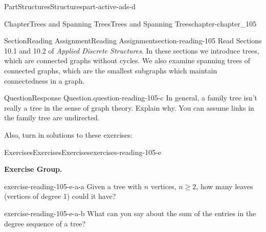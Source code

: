\documentclass[oneside,10pt,]{book}
\numberwithin{equation}{section}
\begin{document}
\begin{partptx}{Part}{Structures}{}{Structures}{}{}{part-active-ads-d}
\typeout{************************************************}
%
\begin{chapterptx}{Chapter}{Trees and Spanning Trees}{}{Trees and Spanning Trees}{}{}{chapter-chapter_105}
\renewcommand*{\chaptername}{Chapter}
\index{}%
%
%
\typeout{************************************************}
\typeout{************************************************}
%
\begin{sectionptx}{Section}{Reading Assignment}{}{Reading Assignment}{}{}{section-reading-105}
Read Sections 10.1 and 10.2 of \emph{Applied Discrete Structures}. In these sections we introduce trees, which are connected graphs without cycles.  We also examine spanning trees of connected graphs, which are the smallest subgraphs which maintain connectedness in a graph.%
\begin{question}{Question}{Response Question.}{question-reading-105-c}%
In general, a family tree isn't really a tree in the sense of graph theory. Explain why.  You can assume links in the family tree are undirected.%
\end{question}
Also, turn in solutions to these exercises:%
%
%
\typeout{************************************************}
\typeout{************************************************}
%
\begin{exercises-subsection-numberless}{Exercises}{Exercises}{}{Exercises}{}{}{exercises-reading-105-e}
\par\medskip\noindent%
\textbf{Exercise Group.}\space\space%
\begin{exercisegroup}
\begin{divisionexerciseeg}{1}{}{}{exercise-reading-105-e-a-a}%
Given a tree with \(n\) vertices, \(n \geq 2\), how many leaves (vertices of degree 1) could it have?%
\end{divisionexerciseeg}%
\begin{divisionexerciseeg}{2}{}{}{exercise-reading-105-e-a-b}%
What can you say about the sum of the entries in the degree sequence of a tree?%
\end{divisionexerciseeg}%
\end{exercisegroup}
\par\medskip\noindent
\end{exercises-subsection-numberless}
\end{sectionptx}
%
%
\typeout{************************************************}
\typeout{************************************************}

\end{chapterptx}
\end{partptx}
\end{document}
